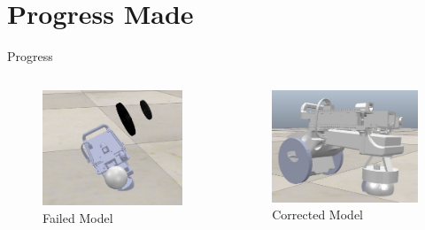\documentclass{beamer}
\begin{document}
\section{Progress Made}
\begin{frame}{Progress}

\begin{columns}
\begin{column}{0.5\textwidth}
\begin{figure}
\includegraphics[scale=0.2]{figs/img/failedModel.JPG}
\caption{Failed Model}
\end{figure}
\end{column}

\begin{column}{0.5\textwidth}
\begin{center}

\begin{figure}
\includegraphics[scale=0.2]{figs/img/simpleModel.JPG}
\caption{Corrected Model}
\end{figure}
\end{center}

\end{column}

\end{columns}
\end{frame}
\end{document}
